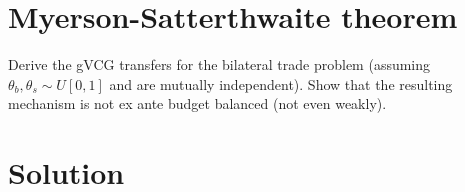 \documentclass[a4paper]{article}
\newif\ifsolutions
\begin{document}
\ifsolutions
\section*{Solution}
LCT for any $i$ is $\tilde{\theta}_i = -\hat{\theta}$ (you do not actually need to calculate the expectation to find it, since the expression that $\tilde{\theta}_i$ minimizes is weakly monotone in $\theta_i$ -- i.e., one of the edges of the support is the solution). The gVCG transfers are then given by
\begin{align*}
	t_i^{gVCG}(\theta) &= \max \left\{0, \sum_{j\neq i}\theta_j -\hat{\theta} - c \right\} - \left(\sum_{j\neq i}\theta_j -c\right) \cdot \mathbb{I} \left\{ \sum_{j=1}^N \theta_j - c > 0 \right\}
	\\
	&= \begin{cases}
		0	&	\text{ if } \sum_{j=1}^N \theta_j - c \leq 0,
		\\
		-\left(\sum_{j\neq i}\theta_j - c \right)	&	\text{ if }	\sum_{j\neq i} \theta_j - \hat{\theta} - c \leq 0 < \sum_{j=1}^N \theta_j - c,
		\\
		-\hat{\theta}	&	\text{ if } \sum_{j\neq i}\theta_j -\hat{\theta} - c > 0.
	\end{cases}
\end{align*}
\fi



\section{Myerson-Satterthwaite theorem}

Derive the gVCG transfers for the bilateral trade problem (assuming $\theta_b,\theta_s \sim U[0,1]$ and are mutually independent). Show that the resulting mechanism is not ex ante budget balanced (not even weakly).

\ifsolutions
\section*{Solution}
\end{document}
